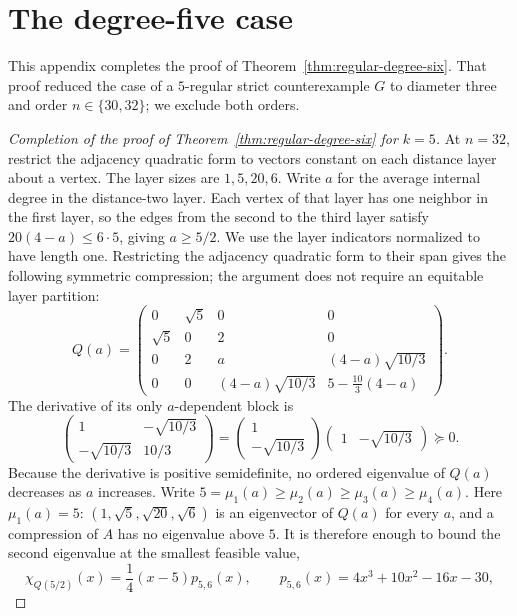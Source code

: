 \documentclass[a4paper,10pt,reqno]{amsart}
\theoremstyle{plain}
\theoremstyle{definition}
\theoremstyle{remark}
\begin{document}
\section{The degree-five case}
\label{app:degree-five}

This appendix completes the proof of Theorem~\ref{thm:regular-degree-six}.
That proof reduced the case of a \(5\)-regular strict counterexample \(G\) to
diameter three and order \(n\in\{30,32\}\); we exclude both orders.

\begin{proof}[Completion of the proof of Theorem~\ref{thm:regular-degree-six} for \(k=5\)]
At \(n=32\), restrict the
adjacency quadratic form to vectors constant on each distance layer about
a vertex. The layer sizes are \(1,5,20,6\). Write \(a\) for the average
internal degree in the distance-two layer.  Each vertex of that layer has
one neighbor in the first layer, so the edges from the second to the third
layer satisfy \(20(4-a)\le6\cdot5\), giving \(a\ge5/2\).
We use the layer indicators normalized to have length one. Restricting the
adjacency quadratic form to their span gives the following symmetric
compression; the argument does not require an equitable layer partition:
\[
 Q(a)=
 \begin{pmatrix}
 0&\sqrt5&0&0\\
 \sqrt5&0&2&0\\
 0&2&a&(4-a)\sqrt{10/3}\\
 0&0&(4-a)\sqrt{10/3}&5-\frac{10}{3}(4-a)
 \end{pmatrix}.
\]
The derivative of its only \(a\)-dependent block is
\[
 \begin{pmatrix}1&-\sqrt{10/3}\\-\sqrt{10/3}&10/3\end{pmatrix}
 =
 \begin{pmatrix}1\\-\sqrt{10/3}\end{pmatrix}
 \begin{pmatrix}1&-\sqrt{10/3}\end{pmatrix}\succeq0.
\]
Because the derivative is positive semidefinite, no ordered eigenvalue of
\(Q(a)\) decreases as \(a\) increases. Write
\(5=\mu_1(a)\ge\mu_2(a)\ge\mu_3(a)\ge\mu_4(a)\).
Here \(\mu_1(a)=5\): \((1,\sqrt5,\sqrt{20},\sqrt6)\) is an eigenvector of
\(Q(a)\) for every \(a\), and a compression of \(A\) has no eigenvalue
above \(5\).
It is therefore enough to bound the second eigenvalue at the smallest
feasible value,
\[
 \chi_{Q(5/2)}(x)=\frac14(x-5)p_{5,6}(x),
 \qquad
 p_{5,6}(x)=4x^3+10x^2-16x-30,
\]
\end{proof}
\end{document}
